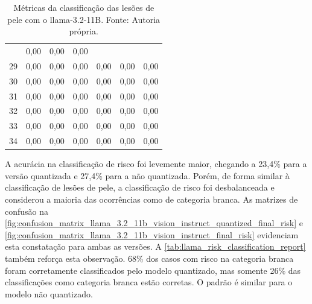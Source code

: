 \begin{table}[ht]
\begin{tabular}{l|c|c|c|c|c|c}
              & 0,00                                   & 0,00                                      & 0,00
        \\
        29    & 0,00                                   & 0,00                                      & 0,00
              & 0,00                                   & 0,00                                      & 0,00
        \\
        30    & 0,00                                   & 0,00                                      & 0,00
              & 0,00                                   & 0,00                                      & 0,00
        \\
        31    & 0,00                                   & 0,00                                      & 0,00
              & 0,00                                   & 0,00                                      & 0,00
        \\
        32    & 0,00                                   & 0,00                                      & 0,00
              & 0,00                                   & 0,00                                      & 0,00
        \\
        33    & 0,00                                   & 0,00                                      & 0,00
              & 0,00                                   & 0,00                                      & 0,00
        \\
        34    & 0,00                                   & 0,00                                      & 0,00
              & 0,00                                   & 0,00                                      & 0,00
        \\ \hline
    \end{tabular}
    \label{tab:llama_skin_lesion_classification_report}
    \caption{Métricas da classificação das lesões de pele com o \ac{llama}-3.2-11B. Fonte: Autoria própria.}
\end{table}

\clearpage

A acurácia na classificação de risco foi levemente maior, chegando a 23,4\% para a versão quantizada e 27,4\% para a
não quantizada. Porém, de forma similar à classificação de lesões de pele, a classificação de risco foi desbalanceada e
considerou a maioria das ocorrências como de categoria branca. As matrizes de confusão na
\autoref{fig:confusion_matrix_llama_3.2_11b_vision_instruct_quantized_final_risk} e
\autoref{fig:confusion_matrix_llama_3.2_11b_vision_instruct_final_risk} evidenciam esta constatação para ambas as
versões. A \autoref{tab:llama_risk_classification_report} também reforça esta observação. 68\% dos casos com risco na
categoria branca foram corretamente classificados pelo modelo quantizado, mas somente 26\% das classificações como
categoria branca estão corretas. O padrão é similar para o modelo não quantizado.

